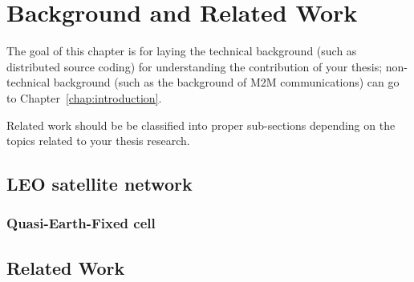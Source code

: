 \chapter{Background and Related Work}
\label{chap:background}

The goal of this chapter is for laying the technical background (such as distributed source coding) for understanding the contribution of your thesis; non-technical background (such as the background of M2M communications) can go to Chapter~\ref{chap:introduction}.

Related work should be be classified into proper sub-sections depending on the topics
related to your thesis research.
\section{LEO satellite network}
\subsection{Quasi-Earth-Fixed cell}
\section{Related Work}
